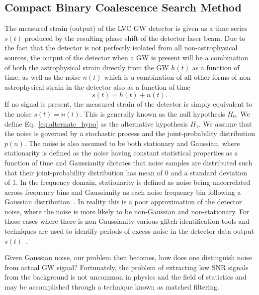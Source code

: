 \subsection{Compact Binary Coalescence Search Method}

The measured strain (output) of the \ac{LVC} \ac{GW} detector is given as a 
time series $s(t)$ produced by the resulting phase shift of the detector laser beam. Due to the fact that
the detector is not perfectly isolated from all non-astrophysical sources, the output of the detector when a \ac{GW} is present will be a combination of 
both the astrophysical strain directly  
from the \ac{GW} $h(t)$ as a function of time, as well as the noise $n(t)$ 
which is a combination of all other forms of non-astrophysical strain in the 
detector also as a function of time
%
\begin{equation}\label{eq:alternate_hypo}
    s(t) = h(t) + n(t).
\end{equation}{}
%
If no signal is present, the measured strain of the detector 
is simply equivalent to the noise $s(t) = n(t)$. This is generally known 
as the null hypothesis $H_0$. We define Eq.~\ref{eq:alternate_hypo} as the alternative hypothesis $H_1$. We assume that the noise is governed by 
a stochastic process and the joint-probability 
distribution $p(n)$. The noise is also assumed to be both stationary and 
Gaussian, where stationarity is defined as the noise  
having constant statistical properties as a function of time 
and Gaussianity dictates that noise 
samples are distributed such that their joint-probability distribution 
has mean of 0 and a standard deviation of 1. In the frequency domain, 
stationarity is defined as noise being uncorrelated across frequency bins and 
Gaussianity as each noise frequency bin following a Gaussian 
distribution~\cite{Abbott_2020}. 
In reality this is a poor approximation of the detector noise, where the noise
is 
more likely to be non-Gaussian and non-stationary. For those cases where there 
is non-Gaussianity various glitch identification tools and techniques are 
used to identify periods of excess noise in the detector data
output $s(t)$~\cite{Abbott_2020,2021CQGra..38m5014D,0264-9381-34-6-064003,
2018RSPTA.37670286N,abbott2016characterization}.

Given Gaussian noise, our problem then becomes, how does one distinguish noise from actual \ac{GW} signal? Fortunately, the problem of extracting low \ac{SNR} signals from the background is not uncommon in physics and the field of statistics and may be accomplished through a technique known as matched 
filtering.

